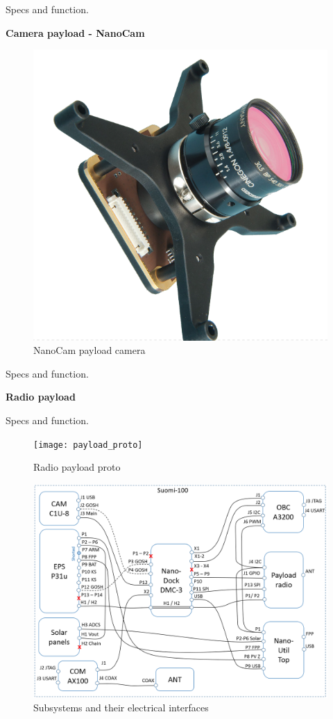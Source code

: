 \documentclass[english,12pt,a4paper,pdftex,elec,utf8]{aaltothesis}
\begin{document}
Specs and function.\par
\textbf{Camera payload - NanoCam}\par 
\begin{figure}[h!]
\caption{NanoCam payload camera}
\includegraphics[scale=0.2]{nanocam}
\end{figure} 
Specs and function.\par
\textbf{Radio payload}\par 
Specs and function.\par 
\begin{figure}[h!]
\caption{Radio payload proto}
\texttt{[image: payload\_proto]}
\end{figure}
\begin{figure}[h!]
\caption{Subsystems and their electrical interfaces}
\includegraphics[scale=0.23]{E_interfaces}
\end{figure}
\end{document}
